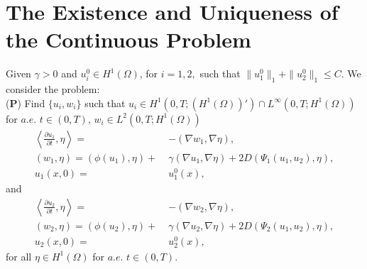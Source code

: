 \section{The Existence and Uniqueness of the Continuous Problem}
Given $\gamma > 0$ and $u_i^0\in H^1(\Omega)$, for $i=1,2,$ such that
$\|u_1^0\|_1+\|u_2^0\|_1\leq C$.  We consider the problem: \\
({\textbf P}) \quad Find
$\{u_i, w_i\}$  such that $u_i \in
H^1(0,T;(H^1(\Omega))')\cap L^\infty(0,T;H^1(\Omega))$ for $a.e.$\; $t\in(0,T)$, $ w_i \in L^2(0,T;H^1(\Omega))$ 
\eqlabon 
\begin{align} 
\left \langle\frac{\partial u_{1}}{\partial t},\eta \right\rangle
=\;& - (\nabla w_{1}  ,\nabla\eta ),\label{2B0000a}\\
(w_{1},\eta) =(\phi(u_1),\eta)+\;& \gamma (\nabla u_{1},\nabla\eta )+2D (\Psi_1(u_1,u_2),\eta),\label{2B0000b}\\
u_1(x,0) =\;&  u^0_1(x),\label{2B0000c}
\end{align}
and
\begin{align} 
\left\langle\frac{\partial u_{2}}{\partial t},\eta \right\rangle =\;&  - (\nabla w_{2}  ,\nabla\eta ),\label{2B0000d}\\
(w_{2},\eta) =(\phi(u_2),\eta)+\;& \gamma (\nabla u_{2},\nabla\eta )+2D(\Psi_2(u_1,u_2),\eta),\label{2B0000e}\\
u_2(x,0)=\;&  u^0_2(x),\label{2B0000f}
\end{align}
for all $\eta\in H^1(\Omega)$ for $a.e.$\; $t\in(0,T)$.
\eqlaboff

